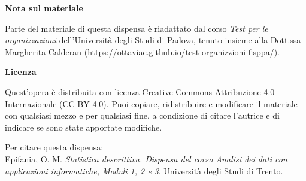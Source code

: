 {  %
  \thispagestyle{empty}
  \null\vfill
  \begin{small}
  \noindent\textbf{Nota sul materiale}\par
  \vspace{2mm}
  \noindent Parte del materiale di questa dispensa è riadattato dal corso
  \emph{Test per le organizzazioni} dell'Università degli Studi di Padova,
  tenuto insieme alla Dott.ssa Margherita Calderan
  (\url{https://ottaviae.github.io/test-organizzioni-fisppa/}).

  \vspace{8mm}
  \noindent\textbf{Licenza}\par
  \vspace{2mm}
  \noindent Quest'opera è distribuita con licenza
  \href{https://creativecommons.org/licenses/by/4.0/deed.it}{Creative Commons
  Attribuzione 4.0 Internazionale (CC BY 4.0)}.
  Puoi copiare, ridistribuire e modificare il materiale con qualsiasi mezzo
  e per qualsiasi fine, a condizione di citare l'autrice e di indicare se
  sono state apportate modifiche.

  \vspace{3mm}
  \noindent Per citare questa dispensa:\\
  Epifania, O. M. \emph{Statistica descrittiva. Dispensa del corso Analisi dei
  dati con applicazioni informatiche, Moduli 1, 2 e 3}. Università degli Studi
  di Trento.
  \end{small}
  \clearpage
}
